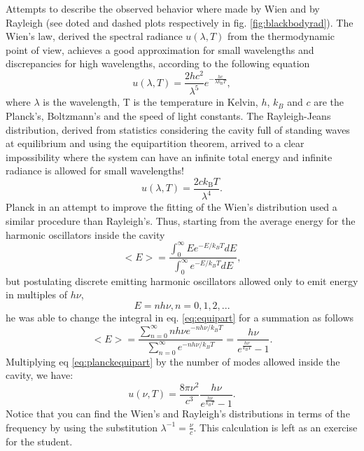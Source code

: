\documentclass{article}
\begin{document}
Attempts to describe the observed behavior where made by Wien and by Rayleigh (see doted and dashed plots respectively in fig. \ref{fig:blackbodyrad}). The Wien's law, derived the spectral radiance $u(\lambda,T)$ from the thermodynamic point of view, achieves a good approximation for small wavelengths and discrepancies for high wavelengths, according to the following equation
\begin{equation}
  u(\lambda, T) = \frac{2hc^2}{\lambda^5} e^{-\frac{hc}{\lambda k_\text{B} T}},
\end{equation}
where $\lambda$ is the wavelength, T is the temperature in Kelvin, $h$, $k_B$ and $c$ are the Planck's, Boltzmann's and the speed of light constants.
The Rayleigh-Jeans distribution, derived from statistics considering the cavity full of standing waves at equilibrium and using the equipartition theorem, arrived to a clear impossibility where the system can have an infinite total energy and infinite radiance is allowed for small wavelengths! 
\begin{equation}
  u(\lambda,T) = \frac{2ck_\text{B}T}{\lambda^4}.
\end{equation}
Planck in an attempt to improve the fitting of the Wien's distribution used a similar procedure than Rayleigh's. Thus, starting from the average energy for the harmonic oscillators inside the cavity
\begin{equation}\label{eq:equipart}
  <E> = \frac{\int_0^\infty E e^{-E/k_B T}dE}{\int_0^\infty e^{-E/k_B T}dE},
\end{equation}
but postulating discrete emitting harmonic oscillators allowed only to emit energy in multiples of $h\nu$,
\begin{equation}
  E = nh\nu, n=0,1,2,...
\end{equation}
he was able to change the integral in eq. \ref{eq:equipart} for a summation as follows
\begin{equation}\label{eq:planckequipart}
  <E> = \frac{\sum_{n=0}^\infty nh\nu e^{-nh\nu/k_B T}}{\sum_{n=0}^\infty e^{-nh\nu/k_B T}} = \frac{h\nu}{e^{\frac{h\nu}{k_B T}}-1}.
\end{equation}
Multiplying eq \ref{eq:planckequipart} by the number of modes allowed inside the cavity, we have:
\begin{equation}\label{eq:planckrad}
  u(\nu,T) = \frac{8\pi\nu^2}{c^3} \frac{h\nu}{e^{\frac{h\nu}{k_B T}}-1}.
\end{equation}
Notice that you can find the Wien's and Rayleigh's distributions in terms of the frequency by using the substitution $\lambda^{-1}=\frac{\nu}{c}$. This calculation is left as an exercise for the student.
\end{document}
